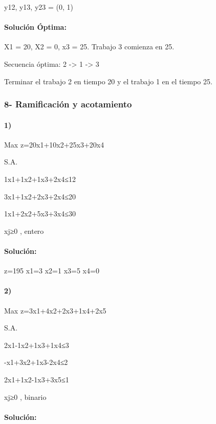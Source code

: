 \documentclass[11pt]{article}
\begin{document}
y12, y13, y23 = (0, 1)

\paragraph{Solución Óptima:}\label{soluciuxf3n-uxf3ptima}

X1 = 20, X2 = 0, x3 = 25. Trabajo 3 comienza en 25.

Secuencia óptima: 2 -\textgreater{} 1 -\textgreater{} 3

Terminar el trabajo 2 en tiempo 20 y el trabajo 1 en el tiempo 25.

    \subsubsection{\texorpdfstring{8- \textbf{Ramificación y
acotamiento}}{8- Ramificación y acotamiento}}\label{ramificaciuxf3n-y-acotamiento}

\paragraph{1)}\label{section}

Max z=20x1+10x2+25x3+20x4

S.A.

1x1+1x2+1x3+2x4≤12

3x1+1x2+2x3+2x4≤20

1x1+2x2+5x3+3x4≤30

xj≥0 , entero

\paragraph{Solución:}\label{soluciuxf3n}

z=195 x1=3 x2=1 x3=5 x4=0

\paragraph{2)}\label{section-1}

Max z=3x1+4x2+2x3+1x4+2x5

S.A.

2x1-1x2+1x3+1x4≤3

-x1+3x2+1x3-2x4≤2

2x1+1x2-1x3+3x5≤1

xj≥0 , binario

\paragraph{Solución:}\label{soluciuxf3n-1}
\end{document}
